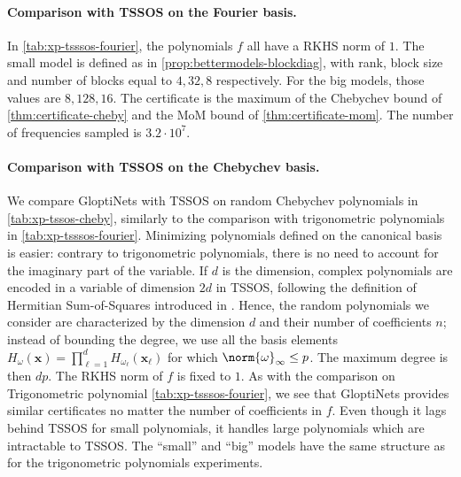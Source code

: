 \documentclass{article}
\begin{document}
\paragraph{Comparison with TSSOS on the Fourier basis.}
In \cref{tab:xp-tsssos-fourier}, the polynomials $f$ all have a RKHS norm of $1$. The small model is defined as in \cref{prop:bettermodels-blockdiag}, with rank, block size and number of blocks equal to $4, 32, 8$ respectively. For the big models, those values are $8, 128, 16$. The certificate is the maximum of the Chebychev bound of \cref{thm:certificate-cheby} and the MoM bound of \cref{thm:certificate-mom}. The number of frequencies sampled is $3.2 \cdot 10^7$.

\paragraph{Comparison with TSSOS on the Chebychev basis.}
We compare GloptiNets with TSSOS on random Chebychev polynomials in \cref{tab:xp-tssos-cheby}, similarly to the comparison with trigonometric polynomials in \cref{tab:xp-tsssos-fourier}. Minimizing polynomials defined on the canonical basis is easier: contrary to trigonometric polynomials, there is no need to account for the imaginary part of the variable. If $d$ is the dimension, complex polynomials are encoded in a variable of dimension $2d$ in TSSOS, following the definition of Hermitian Sum-of-Squares introduced in \cite{joszLasserreHierarchyLarge2018a}. Hence, the random polynomials we consider are characterized by the dimension $d$ and their number of coefficients $n$; instead of bounding the degree, we use all the basis elements $H_{\omega}(\mathbf{x}) = \prod_{\ell = 1}^d H_{\omega_\ell} (\mathbf{x}_\ell)$ for which $\norm{\omega}_\infty \leq p$. The maximum degree is then $dp$. The RKHS norm of $f$ is fixed to $1$. As with the comparison on Trigonometric polynomial \cref{tab:xp-tsssos-fourier}, we see that GloptiNets provides similar certificates no matter the number of coefficients in $f$. Even though it lags behind TSSOS for small polynomials, it handles large polynomials which are intractable to TSSOS. The ``small'' and ``big'' models have the same structure as for the trigonometric polynomials experiments.
\end{document}
